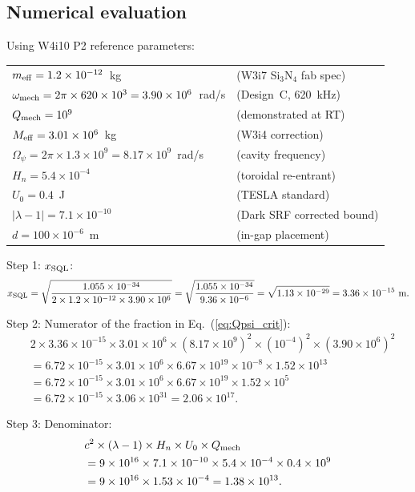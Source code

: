 \documentclass[11pt]{article}
\newcommand{\lam}{\lambda}
\newcommand{\lbone}{|\lambda - 1|}
\newcommand{\Meff}{M_{\rm eff}}
\newcommand{\ee}[1]{\times 10^{#1}}
\newcommand{\Qmech}{Q_{\rm mech}}
\newcommand{\Heff}{H_n}
\theoremstyle{definition}
\theoremstyle{remark}
\begin{document}
\subsection{Numerical evaluation}

Using W4i10 P2 reference parameters:
\begin{center}
\renewcommand{\arraystretch}{1.2}
\begin{tabular}{@{}ll@{}}
$m_{\rm eff} = 1.2\ee{-12}$~kg & (W3i7 Si$_3$N$_4$ fab spec) \\
$\omega_{\rm mech} = 2\pi\times 620\ee{3} = 3.90\ee{6}$~rad/s
  & (Design~C, 620~kHz) \\
$\Qmech = 10^9$ & (demonstrated at RT) \\
$\Meff = 3.01\ee{6}$~kg & (W3i4 correction) \\
$\Omega_\psi = 2\pi\times 1.3\ee{9} = 8.17\ee{9}$~rad/s & (cavity frequency) \\
$\Heff = 5.4\ee{-4}$ & (toroidal re-entrant) \\
$U_0 = 0.4$~J & (TESLA standard) \\
$\lbone = 7.1\ee{-10}$ & (Dark SRF corrected bound) \\
$d = 100\ee{-6}$~m & (in-gap placement) \\
\end{tabular}
\end{center}

Step 1: $x_{\rm SQL}$:
\begin{equation}
x_{\rm SQL} = \sqrt{\frac{1.055\ee{-34}}{2\times 1.2\ee{-12}\times 3.90\ee{6}}}
= \sqrt{\frac{1.055\ee{-34}}{9.36\ee{-6}}}
= \sqrt{1.13\ee{-29}} = 3.36\ee{-15}~\text{m}.
\end{equation}

Step 2: Numerator of the fraction in Eq.~(\ref{eq:Qpsi_crit}):
\begin{align}
&2\times 3.36\ee{-15}\times 3.01\ee{6}\times(8.17\ee{9})^2
\times(10^{-4})^2\times(3.90\ee{6})^2 \nonumber\\
&= 6.72\ee{-15}\times 3.01\ee{6}\times 6.67\ee{19}
\times 10^{-8}\times 1.52\ee{13} \nonumber\\
&= 6.72\ee{-15}\times 3.01\ee{6}\times 6.67\ee{19}
\times 1.52\ee{5} \nonumber\\
&= 6.72\ee{-15}\times 3.06\ee{31} = 2.06\ee{17}.
\end{align}

Step 3: Denominator:
\begin{align}
&c^2\times(\lam-1)\times\Heff\times U_0\times\Qmech \nonumber\\
&= 9\ee{16}\times 7.1\ee{-10}\times 5.4\ee{-4}\times 0.4\times 10^9 \nonumber\\
&= 9\ee{16}\times 1.53\ee{-4} = 1.38\ee{13}.
\end{align}
\end{document}
